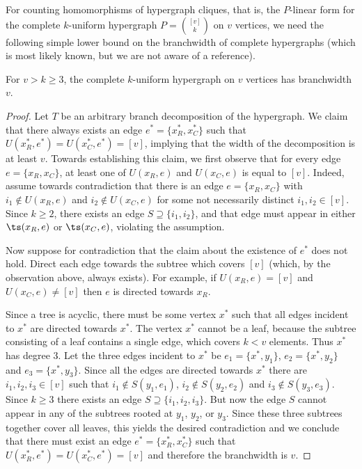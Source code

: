 For counting homomorphisms of hypergraph cliques, that is,
the $P$-linear form for the complete $k$-uniform hypergraph
$P=\binom{[v]}{k}$ on $v$ vertices, we need the
following simple lower bound on the branchwidth of complete
hypergraphs (which is most likely known, but we are not aware of a
reference).

\begin{lemma}
  For $v > k \ge 3$, the complete $k$-uniform hypergraph on $v$ vertices has branchwidth $v$.
\end{lemma}

\begin{proof}
  Let $T$ be an arbitrary branch decomposition of the hypergraph.
We claim that there always
exists an edge $e^* = \{x^*_R, x^*_C\}$ such that $U(x^*_R, e^*) = U(x^*_C, e^*) = [v]$, implying that the width of the decomposition is at least $v$.
Towards establishing this claim, we first observe that for every edge $e = \{x_R, x_C\}$,
at least one of
  $U(x_R, e)$ and $U(x_C, e)$ is equal to $[v]$. Indeed, assume towards contradiction
  that there is an edge $e = \{x_R, x_C\}$ with
  $i_1 \not\in U(x_R, e)$ and $i_2 \not\in U(x_C, e)$ for some not
  necessarily distinct $i_1, i_2 \in [v]$.  Since $k \ge 2$, there exists
  an edge $S \supseteq \{i_1, i_2\}$, and that edge must appear in
  either $\ts(x_R, e)$  or $\ts(x_C,  e)$, violating the assumption.

  Now suppose for contradiction that the claim about the existence of $e^*$ does not hold.
  Direct each edge towards the subtree which covers $[v]$ (which, by the observation above, always exists).  For
  example, if $U(x_R, e) = [v]$ and $U(x_C, e) \ne [v]$ then $e$ is
  directed towards $x_R$.

   Since a tree is acyclic, there must be some vertex $x^*$ such that
  all edges incident to $x^*$ are directed towards $x^*$.  The vertex
  $x^*$ cannot be a leaf, because the subtree consisting of a leaf
  contains a single edge, which covers $k < v$ elements.  Thus $x^*$
  has degree $3$.  Let the three edges incident to $x^*$ be $e_1 =
  \{x^*, y_1\}$, $e_2 = \{x^*, y_2\}$ and $e_3 = \{x^*, y_3\}$.  Since
  all the edges are directed towards $x^*$ there are $i_1, i_2, i_3
  \in [v]$ such that $i_1 \not\in S(y_1, e_1)$, $i_2 \not\in S(y_2,
  e_2)$ and $i_3 \not\in S(y_3, e_3)$.  Since $k \ge 3$ there exists an
  edge $S \supseteq \{i_1,i_2,i_3\}$.  But now the edge $S$ cannot appear in any of the subtrees rooted at $y_1$, $y_2$, or $y_3$.
  Since these three subtrees together cover all leaves, this yields
  the desired contradiction and we conclude that there must exist an
  edge $e^* = \{x^*_R, x^*_C\}$ such that $U(x^*_R, e^*) = U(x^*_C, e^*) = [v]$
  and therefore the branchwidth is $v$.
\end{proof}



